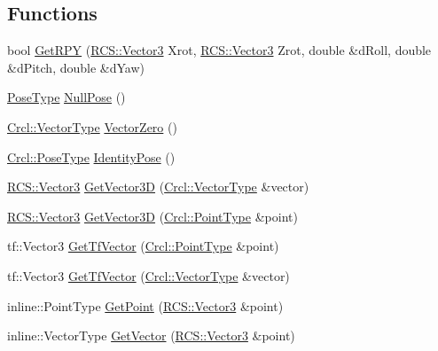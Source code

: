 \subsection*{Functions}
\begin{DoxyCompactItemize}
\item 
bool \hyperlink{namespaceCrcl_a018b04e2941c53d1359bf069a8fd6694}{Get\-R\-P\-Y} (\hyperlink{namespaceRCS_a688a9db9f1e17b76c410c539997d07a7}{R\-C\-S\-::\-Vector3} Xrot, \hyperlink{namespaceRCS_a688a9db9f1e17b76c410c539997d07a7}{R\-C\-S\-::\-Vector3} Zrot, double \&d\-Roll, double \&d\-Pitch, double \&d\-Yaw)
\item 
\hyperlink{namespaceCrcl_acc6c82b52280f4d0e74b82a92400956e}{Pose\-Type} \hyperlink{namespaceCrcl_af090b8881d747be0380a733dfa9e3138}{Null\-Pose} ()
\item 
\hyperlink{namespaceCrcl_ae868d4ece511d1485ed5d9118395aef8}{Crcl\-::\-Vector\-Type} \hyperlink{namespaceCrcl_add9e9e39ef44f31dae46c86a85201726}{Vector\-Zero} ()
\item 
\hyperlink{namespaceCrcl_acc6c82b52280f4d0e74b82a92400956e}{Crcl\-::\-Pose\-Type} \hyperlink{namespaceCrcl_ac77c1d8cdd8c33effcb7a3705671d06b}{Identity\-Pose} ()
\item 
\hyperlink{namespaceRCS_a688a9db9f1e17b76c410c539997d07a7}{R\-C\-S\-::\-Vector3} \hyperlink{namespaceCrcl_a2a336d0ed78a103dab45851e93ac4016}{Get\-Vector3\-D} (\hyperlink{namespaceCrcl_ae868d4ece511d1485ed5d9118395aef8}{Crcl\-::\-Vector\-Type} \&vector)
\item 
\hyperlink{namespaceRCS_a688a9db9f1e17b76c410c539997d07a7}{R\-C\-S\-::\-Vector3} \hyperlink{namespaceCrcl_a0f2f379b6246979d8c48aa29a8718ab7}{Get\-Vector3\-D} (\hyperlink{namespaceCrcl_a04f09d617642257f5938e52cee2feeef}{Crcl\-::\-Point\-Type} \&point)
\item 
tf\-::\-Vector3 \hyperlink{namespaceCrcl_a8d7ed1f807e5dc9cb7f1ac36c9cb73ae}{Get\-Tf\-Vector} (\hyperlink{namespaceCrcl_a04f09d617642257f5938e52cee2feeef}{Crcl\-::\-Point\-Type} \&point)
\item 
tf\-::\-Vector3 \hyperlink{namespaceCrcl_a1f66cb1e242dc328f6dd4797b4213514}{Get\-Tf\-Vector} (\hyperlink{namespaceCrcl_ae868d4ece511d1485ed5d9118395aef8}{Crcl\-::\-Vector\-Type} \&vector)
\item 
inline\-::\-Point\-Type \hyperlink{namespaceCrcl_a2c7684178c38711d407412930b9b0205}{Get\-Point} (\hyperlink{namespaceRCS_a688a9db9f1e17b76c410c539997d07a7}{R\-C\-S\-::\-Vector3} \&point)
\item 
inline\-::\-Vector\-Type \hyperlink{namespaceCrcl_acc0f9f00033ff317971e5e33ecea9ba3}{Get\-Vector} (\hyperlink{namespaceRCS_a688a9db9f1e17b76c410c539997d07a7}{R\-C\-S\-::\-Vector3} \&point)

\end{DoxyCompactItemize}
